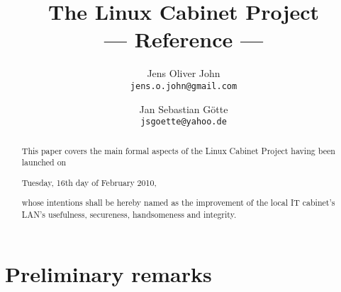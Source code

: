 \documentclass[a4paper,11pt,titlepage]{article}
\title{The Linux Cabinet Project\\--- Reference ---}
\author{Jens Oliver John\\\nolinkurl{jens.o.john@gmail.com}\and Jan Sebastian Götte\\\nolinkurl{jsgoette@yahoo.de}}
\begin{document}
 \maketitle 

\begin{abstract}
This paper covers the main formal aspects of the Linux Cabinet Project having been launched on
\begin{center}Tuesday, 16th day of February 2010,\end{center}
whose intentions shall be hereby named as the improvement of the local IT cabinet's LAN's usefulness, secureness, handsomeness and integrity.
\end{abstract}

\tableofcontents \noindent

\newpage \section{Preliminary remarks}









 
\end{document}
